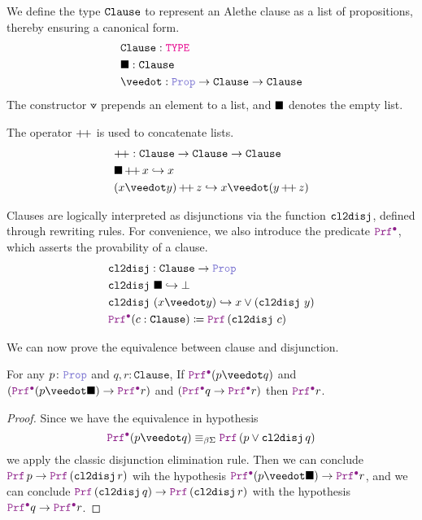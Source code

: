 \begin{definition}\label{def:encoding-clause}
We define the type $\texttt{\upshape{Clause}}$ to represent an Alethe clause as a list of propositions, thereby ensuring a canonical form.
\begin{align*}
&\texttt{Clause}: \type \\
&\nil: \texttt{Clause} \\
&\veedot: \prop \ra \texttt{Clause}  \ra \texttt{Clause}
\end{align*}
The constructor $\veedot$ prepends an element to a list, and $\blacksquare$ denotes the empty list.
\end{definition}

\begin{definition}
The operator $ {+}\!{+} $ is used to concatenate lists.
\begin{align*}
& \pp: \texttt{Clause} \ra \texttt{Clause} \ra \texttt{Clause} \\
& \nil \mathop{\pp} x \re x \\
& (x \veedot y) \mathop{\pp} z \re x \veedot (y \mathop{\pp} z)
\end{align*}
\end{definition}

\begin{definition}\label{def:cl2disj}
Clauses are logically interpreted as disjunctions via the function $\texttt{\upshape{cl2disj}}$, defined through rewriting rules. For convenience, we also introduce the predicate $\pid$, which asserts the provability of a clause.
\begin{align*}
& \kw{cl2disj}: \texttt{Clause} \ra \prop \\
& \cltodisj~\nil \re \bot\\
& \cltodisj~(x \veedot y) \re x \lor (\cltodisj~y) \\
& \pid (c : \texttt{Clause}) \coloneqq \prf\,(\cltodisj~c)
\end{align*}
\end{definition}

We can now prove the equivalence between clause and disjunction.

\begin{lemma}\label{lemma:clause-elim}
For any $p \colon \prop$ and $q,r \colon \texttt{Clause}$, If $\pid (p \veedot q)$ and $(\pid (p \veedot \nil) \ra  \pid r)$ and $(\pid q \ra  \pid r)$ then $\pid r$.
\end{lemma}
\begin{proof}
Since we have the equivalence in hypothesis 
\[
  \pid (p \veedot q) \equivL \prf\,(p \lor \cltodisj\,q)
\]
we apply the classic disjunction elimination rule.
Then we can conclude $\prf\,p \ra \prf\,(\cltodisj\,r)$ wih the hypothesis $\pid (p \veedot \nil) \ra  \pid r$, and we can conclude $\prf\,(\cltodisj\,q) \ra \prf\,(\cltodisj\,r)$
with the hypothesis $\pid q \ra  \pid r$.
\end{proof}

